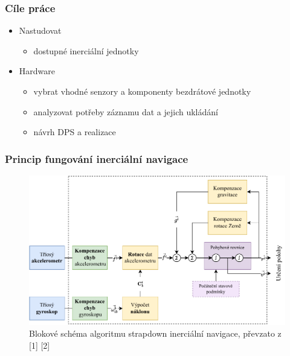 \documentclass[%
  12pt,       				%
	t,                  %
	aspectratio=1610,   %
	unicode,						%
]{beamer}				    	%
\begin{document}
\disablenavigationsymbols

\maketitle

\begin{frame} 
	\frametitle{Cíle práce}
	\begin{itemize}
			\item Nastudovat
			\begin{itemize}
					\item dostupné inerciální jednotky
				\end{itemize}
			\item Hardware
				\begin{itemize}
					\item vybrat vhodné senzory a komponenty bezdrátové jednotky
					\item analyzovat potřeby záznamu dat a jejich ukládání
					\item návrh DPS a realizace
				\end{itemize}

	\end{itemize}
\end{frame}

\begin{frame} 
	\frametitle{Princip fungování inerciální navigace}
	
			\begin{figure}%
				\centering
				
				\includegraphics[width=0.8\columnwidth]{obrazky/StrapdownBlock}
				\caption{Blokové schéma algoritmu strapdown inerciální navigace, převzato z [1] [2]}%
			\end{figure}
	
\end{frame} 
\end{document}
